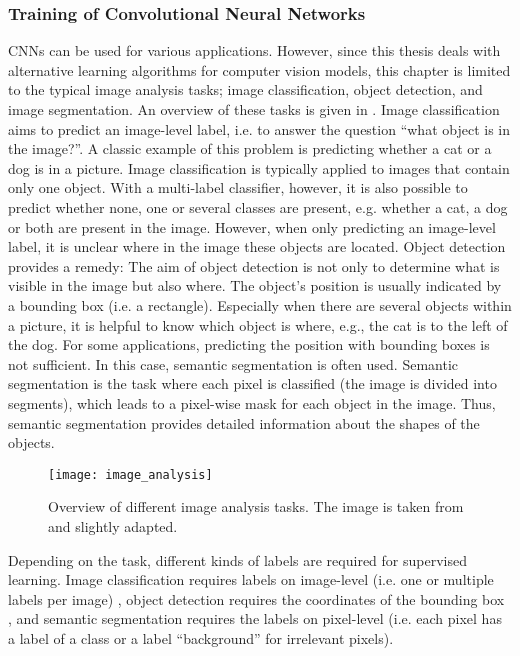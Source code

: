 \subsubsection{Training of Convolutional Neural Networks}
CNNs can be used for various applications.
However, since this thesis deals with alternative learning algorithms for computer vision models, this chapter is limited to the typical image analysis tasks; image classification, object detection, and image segmentation.
An overview of these tasks is given in .
Image classification aims to predict an image-level label, i.e. to answer the question ``what object is in the image?''.
A classic example of this problem is predicting whether a cat or a dog is in a picture.
Image classification is typically applied to images that contain only one object.
With a multi-label classifier, however, it is also possible to predict whether none, one or several classes are present, e.g. whether a cat, a dog or both are present in the image.
However, when only predicting an image-level label, it is unclear where in the image these objects are located.
Object detection provides a remedy:
The aim of object detection is not only to determine what is visible in the image but also where.
The object's position is usually indicated by a bounding box (i.e. a rectangle).
Especially when there are several objects within a picture, it is helpful to know which object is where, e.g., the cat is to the left of the dog.
For some applications, predicting the position with bounding boxes is not sufficient.
In this case, semantic segmentation is often used.
Semantic segmentation is the task where each pixel is classified (the image is divided into segments), which leads to a pixel-wise mask for each object in the image.
Thus, semantic segmentation provides detailed information about the shapes of the objects.

\begin{figure}[h]
    \centering
    \texttt{[image: image\_analysis]}
    \caption[Overview of different image analysis tasks]{Overview of different image analysis tasks. The image is taken from  and slightly adapted.}
\end{figure}

Depending on the task, different kinds of labels are required for supervised learning.
Image classification requires labels on image-level (i.e. one or multiple labels per image) \cite{Lecun_Bottou_Bengio_Haffner_1998, NIPS2012_c399862d, Simonyan_Zisserman_2015, Szegedy_Liu_Jia_Sermanet_Reed_Anguelov_Erhan_Vanhoucke_Rabinovich_2014, He_Zhang_Ren_Sun_2016}, object detection requires the coordinates of the bounding box \cite{Redmon_Divvala_Girshick_Farhadi_2016, Liu_Anguelov_Erhan_Szegedy_Reed_Fu_Berg_2016, He_Gkioxari_Dollar_Girshick_2017}, and semantic segmentation requires the labels on pixel-level \cite{Ronneberger_Fischer_Brox_2015, Wu_Zhang_Huang_Liang_Yu_2019} (i.e. each pixel has a label of a class or a label ``background'' for irrelevant pixels).

